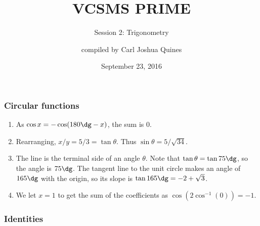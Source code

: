 \documentclass[10pt,paper=letter]{scrartcl}
\begin{document}
\title{VCSMS PRIME}
\subtitle{Session 2: Trigonometry}
\author{compiled by Carl Joshua Quines}
\date{September 23, 2016}

\maketitle

\subsubsection*{Circular functions}

\begin{enumerate}

\item As $\cos x = -\cos (180\dg - x)$, the sum is $0$.

\item Rearranging, $x/y = 5/3 = \tan \theta$. Thus $\sin \theta = 5/\sqrt{34}$.

\item The line is the terminal side of an angle $\theta$. Note that $\tan \theta = \tan 75\dg$, so the angle is $75\dg$. The tangent line to the unit circle makes an angle of $165\dg$ with the origin, so its slope is $\tan 165\dg = -2 + \sqrt{3}$.

\item We let $x = 1$ to get the sum of the coefficients as $\cos(2 \cos^{-1}(0)) = -1$.

\end{enumerate}

\subsubsection*{Identities}
\end{document}
